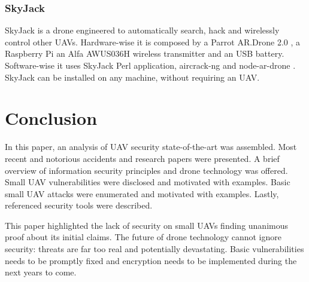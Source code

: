 \documentclass[journal]{IEEEtran}
\begin{document}
\subsubsection{SkyJack}
SkyJack \cite{skyjack} is a drone engineered to automatically search, hack and wirelessly control other UAVs. Hardware-wise it is composed by a Parrot AR.Drone 2.0 \cite{ardrone}, a Raspberry Pi \cite{raspberrypi} an Alfa AWUS036H wireless transmitter and an USB battery. Software-wise it uses SkyJack Perl application, aircrack-ng \cite{aircrackng} and node-ar-drone \cite{nodeardrone}. SkyJack can be installed on any machine, without requiring an UAV.

\section{Conclusion}
In this paper, an analysis of UAV security state-of-the-art was assembled. Most recent and notorious accidents and research papers were presented. A brief overview of information security principles and drone technology was offered. Small UAV vulnerabilities were disclosed and motivated with examples. Basic small UAV attacks were enumerated and motivated with examples. Lastly, referenced security tools were described.

This paper highlighted the lack of security on small UAVs finding unanimous proof about its initial claims. The future of drone technology cannot ignore security: threats are far too real and potentially devastating. Basic vulnerabilities needs to be promptly fixed and encryption needs to be implemented during the next years to come.
\end{document}
